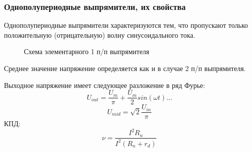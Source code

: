 \subsubsection{Однополупериодные выпрямители, их свойства}

Однополупериодные выпрямители характеризуются тем, что пропускают только положительную (отрицательную) волну синусоидального тока.

\begin{center}
	\begin{figure}[h!]
		\caption{Схема элементарного 1 п/п выпрямителя}
	\end{figure}
\end{center} 

Среднее значение напряжение определяется как и в случае 2 п/п выпрямителя.

Выходное напряжение имеет следующее разложение в ряд Фурье:
\begin{equation}
U_{out} = \frac{U_m}{\pi} + \frac{U_m}{2} sin(\omega t) ...
\end{equation}
\begin{equation}
U_{mid} = \sqrt{2} \frac{U_{in}}{\pi}
\end{equation}
КПД:
\begin{equation}
\nu = \frac{I^2 R_n}{I^2 (R_n + r_d)}
\end{equation}